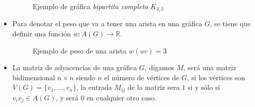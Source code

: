 \documentclass[12pt]{article}
\begin{document}
\begin{itemize}
  \begin{figure}[h!]
    \centering
    \caption{Ejemplo de gráfica \textit{bipartita completa} $K_{3,3}$}    
  \end{figure}

  \newpage
  
\item Para denotar el peso que va a tener una arista en una gráfica $G$, se tiene que definir una función $w:A(G)\rightarrow\mathbb{R}$.

  \begin{figure}[h!]
    \centering
    \caption{Ejemplo de peso de una arista $w(uv)=3$}
  \end{figure}
  
\item La matriz de adyacencias de una gráfica $G$, digamos $M$, será una matriz bidimensional $n\times n$ siendo $n$ el número de vértices de $G$, si los vértices son $V(G)=\{v_1,\ldots,v_n\}$, la entrada $M_{ij}$ de la matriz sera $1$ si y sólo si $v_i v_j\in A(G)$, y será $0$ en cualquier otro caso.


\end{itemize}
\end{document}
